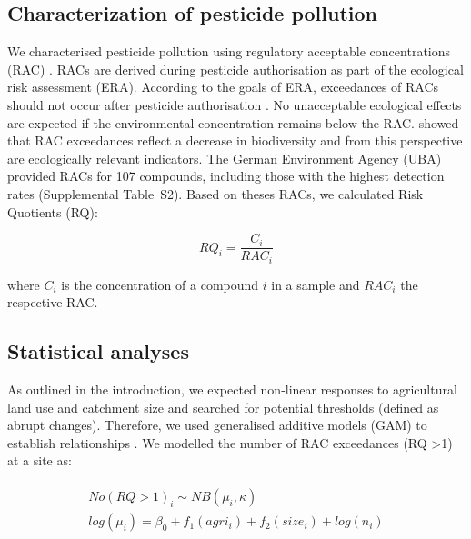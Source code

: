 \documentclass[journal=esthag,manuscript=article]{achemso}
\begin{document}
\subsection{Characterization of pesticide pollution}
We characterised pesticide pollution using regulatory acceptable concentrations (RAC) \citep{brock_linking_2010}.
RACs are derived during pesticide authorisation as part of the ecological risk assessment (ERA).
According to the goals of ERA, exceedances of RACs should not occur after pesticide authorisation \citep{stehle_pesticide_2015}. 
No unacceptable ecological effects are expected if the environmental concentration remains below the RAC. 
\citet{stehle_pesticide_2015} showed that RAC exceedances reflect a decrease in biodiversity and from this perspective are ecologically relevant indicators. 
The German Environment Agency (UBA) provided RACs for 107 compounds, including those with the highest detection rates (Supplemental Table~S2). 
Based on theses RACs, we calculated Risk Quotients (RQ):

\begin{equation}
RQ_i = \frac{C_i}{RAC_i}
\end{equation}

where $C_i$ is the concentration of a compound $i$ in a sample and $RAC_i$ the respective RAC.


\subsection{Statistical analyses}
As outlined in the introduction, we expected non-linear responses to agricultural land use and catchment size and searched for potential thresholds (defined as abrupt changes).
Therefore, we used generalised additive models (GAM) to establish relationships \citep{fewster_analysis_2000}.
We modelled the number of RAC exceedances (RQ \textgreater 1) at a site as:

\begin{align}
\begin{split}
  No(RQ > 1)_i \sim NB(\mu_i, \kappa) \\
  log(\mu_i)= \beta_0 + f_1(agri_i) + f_2(size_i) + log(n_i) \\
\end{split}
\end{align}
\end{document}
